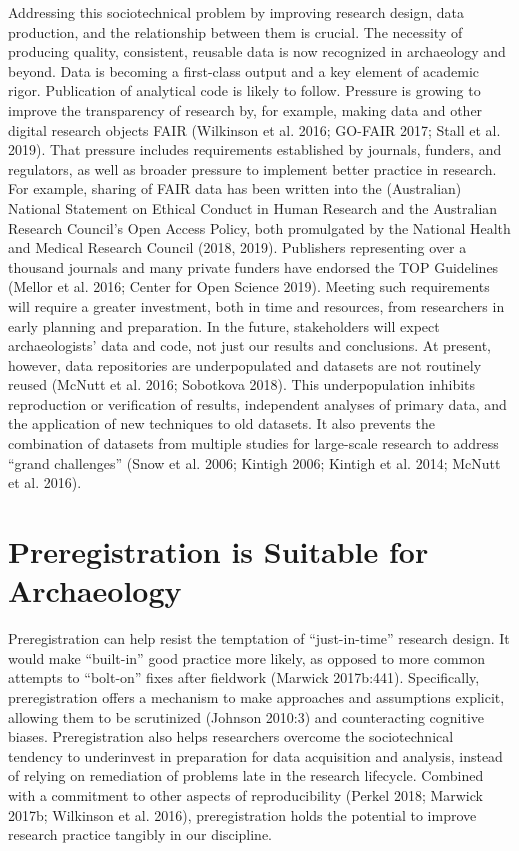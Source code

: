 \documentclass[article]{sa}
\begin{document}
Addressing this sociotechnical problem by improving research design,
data production, and the relationship between them is crucial. The
necessity of producing quality, consistent, reusable data is now
recognized in archaeology and beyond. Data is becoming a first-class
output and a key element of academic rigor. Publication of analytical
code is likely to follow. Pressure is growing to improve the
transparency of research by, for example, making data and other digital
research objects FAIR (Wilkinson et al. 2016; GO-FAIR 2017; Stall et al.
2019). That pressure includes requirements established by journals,
funders, and regulators, as well as broader pressure to implement better
practice in research. For example, sharing of FAIR data has been written
into the (Australian) National Statement on Ethical Conduct in Human
Research and the Australian Research Council's Open Access Policy, both
promulgated by the National Health and Medical Research Council (2018,
2019). Publishers representing over a thousand journals and many private
funders have endorsed the TOP Guidelines (Mellor et al. 2016; Center for
Open Science 2019). Meeting such requirements will require a greater
investment, both in time and resources, from researchers in early
planning and preparation. In the future, stakeholders will expect
archaeologists' data and code, not just our results and conclusions. At
present, however, data repositories are underpopulated and datasets are
not routinely reused (McNutt et al. 2016; Sobotkova 2018). This
underpopulation inhibits reproduction or verification of results,
independent analyses of primary data, and the application of new
techniques to old datasets. It also prevents the combination of datasets
from multiple studies for large-scale research to address ``grand
challenges'' (Snow et al. 2006; Kintigh 2006; Kintigh et al. 2014; McNutt
et al. 2016).

\section{Preregistration is Suitable for
Archaeology}

Preregistration can help resist the temptation of ``just-in-time''
research design. It would make ``built-in'' good practice more likely, as
opposed to more common attempts to ``bolt-on'' fixes after fieldwork
(Marwick 2017b:441). Specifically, preregistration offers a mechanism to
make approaches and assumptions explicit, allowing them to be
scrutinized (Johnson 2010:3) and counteracting cognitive biases.
Preregistration also helps researchers overcome the sociotechnical
tendency to underinvest in preparation for data acquisition and
analysis, instead of relying on remediation of problems late in the
research lifecycle. Combined with a commitment to other aspects of
reproducibility (Perkel 2018; Marwick 2017b; Wilkinson et al. 2016),
preregistration holds the potential to improve research practice
tangibly in our discipline.
\end{document}
